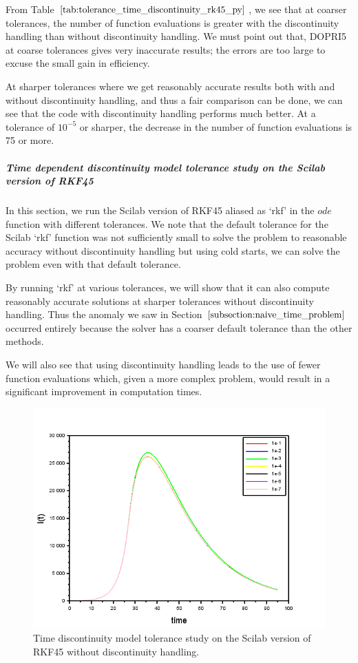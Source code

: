 From Table $\ref{tab:tolerance_time_discontinuity_rk45_py}$, we see that at coarser tolerances, the number of function evaluations is greater with the discontinuity handling than without discontinuity handling. We must point out that, DOPRI5 at coarse tolerances gives very inaccurate results; the errors are too large to excuse the small gain in efficiency.

At sharper tolerances where we get reasonably accurate results both with and without discontinuity handling, and thus a fair comparison can be done, we can see that the code with discontinuity handling performs much better. At a tolerance of $10^{-5}$ or sharper, the decrease in the number of function evaluations is 75 or more.

\subparagraph{Time dependent discontinuity model tolerance study on the Scilab version of RKF45}
In this section, we run the Scilab version of RKF45 aliased as `rkf' in the $ode$ function with different tolerances. We note that the default tolerance for the Scilab `rkf' function was not sufficiently small to solve the problem to reasonable accuracy without discontinuity handling but using cold starts, we can solve the problem even with that default tolerance. 

By running `rkf' at various tolerances, we will show that it can also compute reasonably accurate solutions at sharper tolerances without discontinuity handling. Thus the anomaly we saw in Section $\ref{subsection:naive_time_problem}$ occurred entirely because the solver has a coarser default tolerance than the other methods.

We will also see that using discontinuity handling leads to the use of fewer function evaluations which, given a more complex problem, would result in a significant improvement in computation times.

\begin{figure}[H]
\centering
\includegraphics[width=0.7\linewidth]{./figures/tolerance_time_rk45_no_event_sci}
\caption{Time discontinuity model tolerance study on the Scilab version of RKF45 without discontinuity handling.}
\label{fig:tolerance_time_rk45_no_event_sci}
\end{figure}

